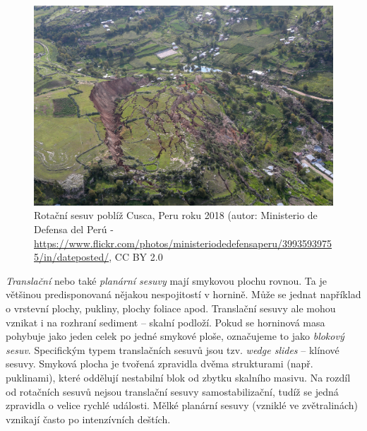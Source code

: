 \begin{figure}[h]
	\centering
	\includegraphics[width=1\linewidth]{obrazky/slope/rotacni}
	\caption{Rotační sesuv poblíž Cusca, Peru  roku 2018 (autor: Ministerio de Defensa del Perú - \url{https://www.flickr.com/photos/ministeriodedefensaperu/39935939755/in/dateposted/}, CC BY 2.0}
	\label{fig:rotacni}
\end{figure}


\emph{Translační} nebo také \emph{planární sesuvy} mají smykovou plochu rovnou. Ta je většinou predisponovaná nějakou nespojitostí v hornině. Může se jednat například o vrstevní plochy, pukliny, plochy foliace apod. Translační sesuvy ale mohou vznikat i na rozhraní sediment -- skalní podloží. Pokud se horninová masa pohybuje jako jeden celek po jedné smykové ploše, označujeme to jako \emph{blokový sesuv}. Specifickým typem translačních sesuvů jsou tzv. \textit{wedge slides} -- klínové sesuvy. Smyková plocha je tvořená zpravidla dvěma strukturami (např. puklinami), které oddělují nestabilní blok od zbytku skalního masivu. Na rozdíl od rotačních sesuvů nejsou translační sesuvy samostabilizační, tudíž se jedná zpravidla o velice rychlé události. Mělké planární sesuvy (vzniklé ve zvětralinách) vznikají často po intenzívních deštích. 

